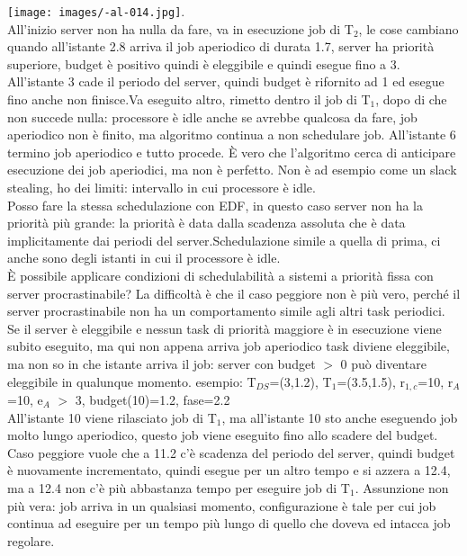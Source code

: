 \documentclass{article}
\begin{document}
\texttt{[image: images/-al-014.jpg]}.\\ All'inizio server non ha nulla da fare, va in esecuzione job di T$_{2}$, le cose cambiano quando all'istante 2.8 arriva il job aperiodico di durata 1.7, server ha priorità superiore, budget è positivo quindi è eleggibile e quindi esegue fino a 3. All'istante 3 cade il periodo del server, quindi budget è rifornito ad 1 ed esegue fino anche non finisce.Va eseguito altro, rimetto dentro il job di T$_{1}$, dopo di che non succede nulla: processore è idle anche se avrebbe qualcosa da fare, job aperiodico non è finito, ma algoritmo continua a non schedulare job. All'istante 6 termino job aperiodico e tutto procede. È vero che l'algoritmo cerca di anticipare esecuzione dei job aperiodici, ma non è perfetto. Non è ad esempio come un slack stealing, ho dei limiti: intervallo in cui processore è idle.\\ Posso fare la stessa schedulazione con EDF, in questo caso server non ha la priorità più grande: la priorità è data dalla scadenza assoluta che è data implicitamente dai periodi del server.Schedulazione simile a quella di prima, ci anche sono degli istanti in cui il processore è idle.\\ È possibile applicare condizioni di schedulabilità a sistemi a priorità fissa con server procrastinabile? La difficoltà è che il caso peggiore non è più vero, perché il server procrastinabile non ha un comportamento simile agli altri task periodici. Se il server è eleggibile e nessun task di priorità maggiore è in esecuzione viene subito eseguito, ma qui non appena arriva job aperiodico task diviene eleggibile, ma non so in che istante arriva il job: server con budget $>$ 0 può diventare eleggibile in qualunque momento. esempio: T$_{DS}$=(3,1.2), T$_{1}$=(3.5,1.5), r$_{1,c}$=10, r$_{A}$=10, e$_{A}$ $>$ 3, budget(10)=1.2, fase=2.2\\ All'istante 10 viene rilasciato job di T$_{1}$, ma all'istante 10 sto anche eseguendo job molto lungo aperiodico, questo job viene eseguito fino allo scadere del budget. Caso peggiore vuole che a 11.2 c'è scadenza del periodo del server, quindi budget è nuovamente incrementato, quindi esegue per un altro tempo e si azzera a 12.4, ma a 12.4 non c'è più abbastanza tempo per eseguire job di T$_{1}$. Assunzione non più vera: job arriva in un qualsiasi momento, configurazione è tale per cui job continua ad eseguire per un tempo più lungo di quello che doveva ed intacca job regolare.
\end{document}
